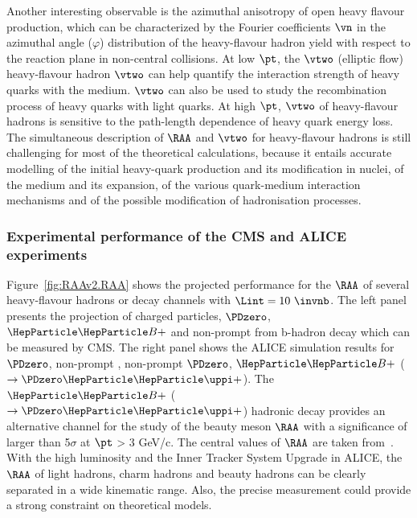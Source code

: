 Another interesting observable is the azimuthal anisotropy of open heavy flavour production, which can be characterized by the Fourier coefficients $\vn$ in the azimuthal angle ($\varphi$) distribution of the heavy-flavour hadron yield with respect to the reaction plane in non-central \PbPb collisions. At low $\pt$, the $\vtwo$ (elliptic flow) heavy-flavour hadron $\vtwo$ can help quantify the interaction strength of heavy quarks with the medium. $\vtwo$ can also be used to study the recombination process of heavy quarks with light quarks. At high $\pt$, $\vtwo$ of heavy-flavour hadrons is sensitive to the path-length dependence of heavy quark energy loss. The simultaneous description of $\RAA$ and $\vtwo$ for heavy-flavour hadrons is still challenging for most of the theoretical calculations, because it entails accurate modelling of the initial heavy-quark production and its modification in nuclei, of the medium and its expansion, of the various quark-medium interaction mechanisms and of the possible modification of hadronisation processes.


\subsubsection{Experimental performance of the CMS and ALICE experiments}

Figure~\ref{fig:RAAv2.RAA} shows the projected performance for the $\RAA$ of several heavy-flavour hadrons or decay channels with $\Lint=10~\invnb$. The left panel presents the projection of charged particles, $\PDzero$, $\PBp$ and non-prompt \PJGy from b-hadron decay which can be measured by CMS. The right panel shows the ALICE simulation results for $\PDzero$, non-prompt \PJGy, non-prompt $\PDzero$, $\PBp$ ($\rightarrow \PDzero \PGpp$). The $\PBp$ ($\rightarrow \PDzero\PGpp$) hadronic decay provides an alternative channel for the study of the beauty meson $\RAA$ with a significance of larger than 5$\sigma$ at $\pt$ > 3 GeV/c. The central values of $\RAA$ are taken from~\cite{raatheory}. With the high luminosity and the Inner Tracker System Upgrade in ALICE, the $\RAA$ of light hadrons, charm hadrons and beauty hadrons can be clearly separated in a wide kinematic range. Also, the precise measurement could provide a strong constraint on theoretical models.

